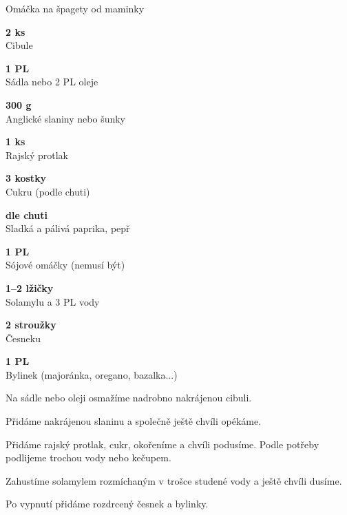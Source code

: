 \documentclass[11pt,a4paper]{article}
\begin{document}
\begin{recipe}[Olive]{Omáčka na špagety od maminky}
    \begin{ingredients}
        \item \parbox[t]{\linewidth}{\raggedright \piece \textbf{2 ks}\\ Cibule}
        \item \parbox[t]{\linewidth}{\raggedright \spoon \textbf{1 PL}\\ Sádla nebo 2 PL oleje}
        \item \parbox[t]{\linewidth}{\raggedright \weight \textbf{300 g}\\ Anglické slaniny nebo šunky}
        \item \parbox[t]{\linewidth}{\raggedright \piece \textbf{1 ks}\\ Rajský protlak}
        \item \parbox[t]{\linewidth}{\raggedright \piece \textbf{3 kostky}\\ Cukru (podle chuti)}
        \item \parbox[t]{\linewidth}{\raggedright \indefinite \textbf{dle chuti}\\ Sladká a pálivá paprika, pepř}
        \item \parbox[t]{\linewidth}{\raggedright \spoon \textbf{1 PL}\\ Sójové omáčky (nemusí být)}
        \item \parbox[t]{\linewidth}{\raggedright \spoon \textbf{1--2 lžičky}\\ Solamylu a 3 PL vody}
        \item \parbox[t]{\linewidth}{\raggedright \piece \textbf{2 stroužky}\\ Česneku}
        \item \parbox[t]{\linewidth}{\raggedright \spoon \textbf{1 PL}\\ Bylinek (majoránka, oregano, bazalka...)}
    \end{ingredients}
    \begin{steps}
        \item Na sádle nebo oleji osmažíme nadrobno nakrájenou cibuli.
        \item Přidáme nakrájenou slaninu a společně ještě chvíli opékáme.
        \item Přidáme rajský protlak, cukr, okořeníme a chvíli podusíme. Podle potřeby podlijeme trochou vody nebo kečupem.
        \item Zahustíme solamylem rozmíchaným v trošce studené vody a ještě chvíli dusíme.
        \item Po vypnutí přidáme rozdrcený česnek a bylinky.
    \end{steps}
\end{recipe}
\end{document}
